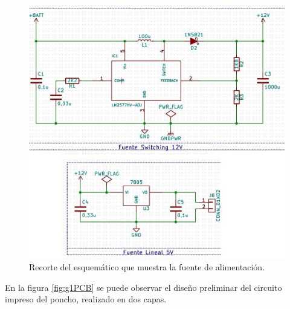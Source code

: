 \begin{figure}[H]
\centering
\includegraphics[scale=.6]{./Figures/g1-fuente.JPG}
\caption{Recorte del esquemático que muestra la fuente de alimentación.}
\label{fig:g1Fuente}
\end{figure}

En la figura \ref{fig:g1PCB} se puede observar el diseño preliminar del circuito impreso del poncho, realizado en dos capas.


